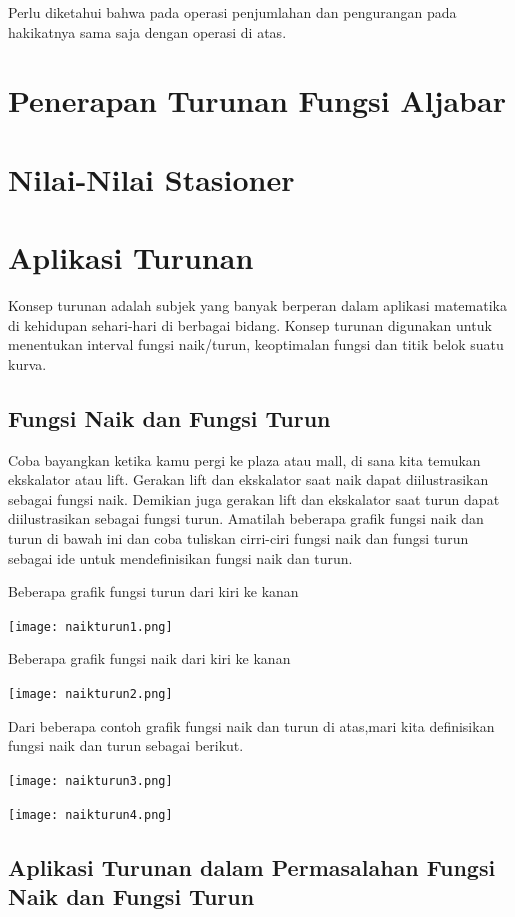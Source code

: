 \documentclass[11pt,fleqn]{book} %
\begin{document}
\noindent 
Perlu diketahui bahwa pada operasi penjumlahan dan pengurangan pada hakikatnya sama saja dengan operasi di atas.
 
 
 
\section{Penerapan Turunan Fungsi Aljabar}

\section{Nilai-Nilai Stasioner}

\section{Aplikasi Turunan}
Konsep turunan adalah subjek yang banyak berperan dalam aplikasi matematika di kehidupan sehari-hari di berbagai bidang. Konsep turunan digunakan untuk
menentukan interval fungsi naik/turun, keoptimalan fungsi dan titik belok suatu kurva.
\subsection{Fungsi Naik dan Fungsi Turun}
Coba bayangkan ketika kamu pergi ke plaza atau mall, di sana kita temukan ekskalator atau lift. Gerakan lift dan ekskalator saat naik dapat diilustrasikan sebagai fungsi naik. Demikian juga gerakan lift dan ekskalator saat turun dapat diilustrasikan sebagai fungsi turun. Amatilah beberapa grafik fungsi naik dan turun di bawah ini dan coba tuliskan cirri-ciri fungsi naik dan fungsi turun sebagai ide untuk mendefinisikan fungsi naik dan turun.

Beberapa grafik fungsi turun dari kiri ke kanan

\texttt{[image: naikturun1.png]}

Beberapa grafik fungsi naik dari kiri ke kanan

\texttt{[image: naikturun2.png]}

Dari beberapa contoh grafik fungsi naik dan turun di atas,mari kita definisikan fungsi naik dan turun sebagai berikut.

\texttt{[image: naikturun3.png]}

\texttt{[image: naikturun4.png]}

\subsection{Aplikasi Turunan dalam Permasalahan Fungsi Naik dan Fungsi Turun}
\end{document}
